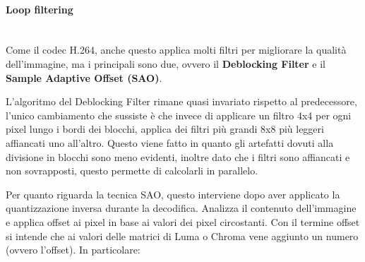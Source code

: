 \documentclass[a4paper,12pt, oneside]{article}
\begin{document}
\paragraph{Loop filtering}\hphantom{A}\\
Come il codec H.264, anche questo applica molti filtri per migliorare la qualità dell'immagine, ma i principali
sono due, ovvero il \textbf{Deblocking Filter} e il \textbf{Sample Adaptive Offset (SAO)}.

L'algoritmo del Deblocking Filter rimane quasi invariato rispetto al predecessore, l'unico cambiamento che sussiste è che invece
di applicare un filtro 4x4 per ogni pixel lungo i bordi dei blocchi, applica dei filtri più grandi 8x8 più
leggeri affiancati uno all'altro. Questo viene fatto in quanto gli artefatti dovuti alla divisione in blocchi
sono meno evidenti, inoltre dato che i filtri sono affiancati e non sovrapposti, questo permette di calcolarli
in parallelo.

Per quanto riguarda la tecnica SAO, questo interviene dopo aver applicato la quantizzazione inversa durante
la decodifica. Analizza il contenuto dell'immagine e applica offset ai pixel in base ai valori dei pixel
circostanti. Con il termine offset si intende che ai valori delle matrici di Luma o Chroma vene aggiunto un
numero (ovvero l'offset).
In particolare:
\end{document}
